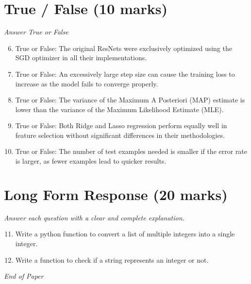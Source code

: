 \documentclass[12pt]{article}
\begin{document}
\section*{True / False (10 marks)}
\textit{Answer True or False}
\begin{enumerate}[label=\arabic*.]
\setcounter{enumi}{5}
\item True or False: The original ResNets were exclusively optimized using the SGD optimizer in all their implementations.
\item True or False: An excessively large step size can cause the training loss to increase as the model fails to converge properly.
\item True or False: The variance of the Maximum A Posteriori (MAP) estimate is lower than the variance of the Maximum Likelihood Estimate (MLE).
\item True or False: Both Ridge and Lasso regression perform equally well in feature selection without significant differences in their methodologies.
\item True or False: The number of test examples needed is smaller if the error rate is larger, as fewer examples lead to quicker results.
\end{enumerate}

\section*{Long Form Response (20 marks)}
\textit{Answer each question with a clear and complete explanation.}
\begin{enumerate}[label=\arabic*.]
\setcounter{enumi}{10}
\item Write a python function to convert a list of multiple integers into a single integer.
\item Write a function to check if a string represents an integer or not.
\end{enumerate}

\vfill
\noindent\textit{End of Paper}
\end{document}
